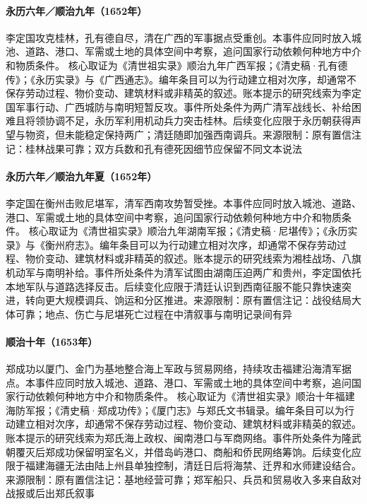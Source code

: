 \hypertarget{civic:EQ-1652-DINGGUO-GUILIN}{}\paragraph{永历六年／顺治九年（1652年）}李定国攻克桂林，孔有德自尽，清在广西的军事据点受重创。本事件应同时放入城池、道路、港口、军需或土地的具体空间中考察，追问国家行动依赖何种地方中介和物质条件。 核心取证为《清世祖实录》顺治九年广西军报；《清史稿·孔有德传》；《永历实录》与《广西通志》。编年条目可以为行动建立相对次序，却通常不保存劳动过程、物价变动、建筑材料或非精英的叙述。账本提示的研究线索为李定国军事行动、广西城防与南明短暂反攻。事件所处条件为两广清军战线长、补给困难且将领协调不足，永历军利用机动兵力突击桂林。后续变化应限于永历朝获得声望与物资，但未能稳定保持两广；清廷随即加强西南调兵。来源限制：原有置信注记：桂林战果可靠；双方兵数和孔有德死因细节应保留不同文本说法
\hypertarget{civic:EQ-1652-DINGGUO-HENGZHOU}{}\paragraph{永历六年／顺治九年夏（1652年）}李定国在衡州击败尼堪军，清军西南攻势暂受挫。本事件应同时放入城池、道路、港口、军需或土地的具体空间中考察，追问国家行动依赖何种地方中介和物质条件。 核心取证为《清世祖实录》顺治九年湖南军报；《清史稿·尼堪传》；《永历实录》与《衡州府志》。编年条目可以为行动建立相对次序，却通常不保存劳动过程、物价变动、建筑材料或非精英的叙述。账本提示的研究线索为湘桂战场、八旗机动军与南明补给。事件所处条件为清军试图由湖南压迫两广和贵州，李定国依托本地军队与道路选择反击。后续变化应限于清廷认识到西南征服不能只靠快速突进，转向更大规模调兵、饷运和分区推进。来源限制：原有置信注记：战役结局大体可靠；地点、伤亡与尼堪死亡过程在中清叙事与南明记录间有异
\hypertarget{civic:EQ-1653-ZHENG-XIAMEN}{}\paragraph{顺治十年（1653年）}郑成功以厦门、金门为基地整合海上军政与贸易网络，持续攻击福建沿海清军据点。本事件应同时放入城池、道路、港口、军需或土地的具体空间中考察，追问国家行动依赖何种地方中介和物质条件。 核心取证为《清世祖实录》顺治十年福建海防军报；《清史稿·郑成功传》；《厦门志》与郑氏文书辑录。编年条目可以为行动建立相对次序，却通常不保存劳动过程、物价变动、建筑材料或非精英的叙述。账本提示的研究线索为郑氏海上政权、闽南港口与军商网络。事件所处条件为隆武朝覆灭后郑成功保留明室名义，并借岛屿港口、商船和侨民网络筹饷。后续变化应限于福建海疆无法由陆上州县单独控制，清廷日后将海禁、迁界和水师建设结合。来源限制：原有置信注记：基地经营可靠；郑军船只、兵员和贸易收入多来自敌对战报或后出郑氏叙事
